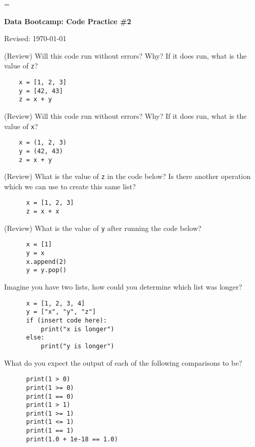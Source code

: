 \documentclass[11pt]{article}
\begin{document}
\parskip=\bigskipamount
\parindent=0.0in
\thispagestyle{empty}


\bigskip\bigskip
\centerline{\Large \bf Data Bootcamp:  Code Practice \#2}
\centerline{Revised: \today}


\begin{questions}

  \item (Review) Will this code run without errors? Why? If it does run, what is the value of \texttt{z}?
    \begin{verbatim}
    x = [1, 2, 3]
    y = [42, 43]
    z = x + y
    \end{verbatim}

  \item (Review) Will this code run without errors? Why? If it does run, what is the value of \texttt{x}?
    \begin{verbatim}
    x = (1, 2, 3)
    y = (42, 43)
    z = x + y
    \end{verbatim}

  \item (Review) What is the value of \texttt{z} in the code below? Is there another operation which we can use to create this same list?
    \begin{verbatim}
      x = [1, 2, 3]
      z = x + x
    \end{verbatim}

  \item (Review) What is the value of \texttt{y} after running the code below?
    \begin{verbatim}
      x = [1]
      y = x
      x.append(2)
      y = y.pop()
    \end{verbatim}

  \item Imagine you have two lists, how could you determine which list was longer?
    \begin{verbatim}
      x = [1, 2, 3, 4]
      y = ["x", "y", "z"]
      if (insert code here):
          print("x is longer")
      else:
          print("y is longer")
    \end{verbatim}

  \item What do you expect the output of each of the following comparisons to be?
    \begin{verbatim}
      print(1 > 0)
      print(1 >= 0)
      print(1 == 0)
      print(1 > 1)
      print(1 >= 1)
      print(1 <= 1)
      print(1 == 1)
      print(1.0 + 1e-18 == 1.0)
    \end{verbatim}


\end{questions}
\end{document}
